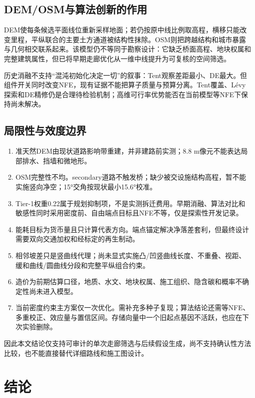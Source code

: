 \documentclass[preprint,12pt]{elsarticle}
\begin{document}
\subsection{DEM/OSM与算法创新的作用}

DEM使每条候选平面线位重新采样地面；若仍按原中线比例取高程，横移只能改变里程，平纵联合的主要土方通道被结构性抹除。OSM则把跨越结构和城市暴露与几何相交联系起来。该模型仍不等同于勘察设计：它缺乏桥面高程、地块权属和完整建筑属性，但已将早期走廊优化从一维中线提升为可复核的空间筛选。

历史消融不支持“混沌初始化决定一切”的叙事：Tent观察差距最小、DE最大。但组件开关同时改变NFE，现有证据不能把算子质量与预算分离。Tent覆盖、L\'evy探索和DE精修仍是合理待检验机制；高维可行率优势能否在当前模型等NFE下保持尚未解决。

\subsection{局限性与效度边界}

\begin{enumerate}[leftmargin=*,label=(\arabic*)]
\item 准天然DEM由现状道路影响带重建，并非建路前实测；8.8 m像元不能表达局部排水、挡墙和微地形。
\item OSM完整性不均。secondary道路不触发桥；缺少被交设施结构高程，暂不能实施竖向净空；15°交角按现状最小15.6°校准。
\item Tier-1权重0.22属于规划抑制项，不是实测拆迁费用。早期消融、算法对比和敏感性同时采用密度前、自由端点目标且NFE不等，仅是探索性开发记录。
\item 能耗目标为货币量且只计算代表方向。端点锚定解决净落差套利，但最终设计需要双向交通加权和经标定的再生制动。
\item 相邻坡差只是竖曲线代理；尚未显式实施凸/凹竖曲线长度、不重叠、视距、缓和曲线/圆曲线分段和完整平纵组合约束。
\item 造价为前期估算口径，地质、水文、地块权属、施工组织、隐含碳和概率不确定性尚未进入模型。
\item 当前密度约束主方案仅一次优化。需补充多种子复现；算法结论还需等NFE、多重校正、效应量与置信区间。存储向量中一个旧起点基因不活跃，也应在下次实验删除。
\end{enumerate}

因此本文结论仅支持可审计的单次走廊筛选与后续假设生成，尚不支持确认性方法比较，也不能直接替代详细路线和施工图设计。

\section{结论}
\end{document}
